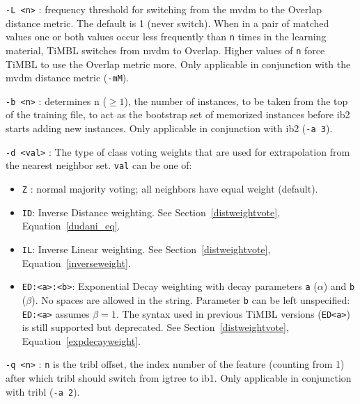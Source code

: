 \documentclass{report}
\begin{document}
\begin{description}
\item {\tt -L <n>} : frequency threshold for switching from the {\sc
mvdm} to the Overlap distance metric. The default is 1 (never
switch). When in a pair of matched values one or both values occur
less frequently than {\tt n} times in the learning material, TiMBL
switches from {\sc mvdm} to Overlap. Higher values of {\tt n} force
TiMBL to use the Overlap metric more. Only applicable in conjunction
with the {\sc mvdm} distance metric ({\tt -mM}).

\item {\tt -b <n>} : determines n ($\geq 1$), the number of instances,
to be taken from the top of the training file, to act as the bootstrap
set of memorized instances before {\sc ib2} starts adding new
instances. Only applicable in conjunction with {\sc ib2} ({\tt -a 3}).

\item {\tt -d <val>} : The type of class voting weights that are used for
extrapolation from the nearest neighbor set. {\tt val} can be one of:
	\begin{itemize} 

  	\item {\tt Z} : normal majority voting; all neighbors have
         equal weight (default).

  	\item {\tt ID}: Inverse Distance weighting. See
  	Section~\ref{distweightvote}, Equation~\ref{dudani_eq}.

  	\item {\tt IL}: Inverse Linear weighting. See
  	Section~\ref{distweightvote}, Equation~\ref{inverseweight}.

  	\item {\tt ED:<a>:<b>}: Exponential Decay weighting with decay
  	parameters {\tt a} ($\alpha$) and {\tt b} ($\beta$). No spaces
  	are allowed in the string. Parameter {\tt b} can be left
  	unspecified: {\tt ED:<a>} assumes $\beta=1$. The syntax used
  	in previous TiMBL versions ({\tt ED<a>}) is still supported
  	but deprecated. See Section~\ref{distweightvote},
  	Equation~\ref{expdecayweight}.

\end{itemize}

\item {\tt -q <n>} : {\tt n} is the {\sc tribl} offset, the index
number of the feature (counting from 1) after which {\sc tribl} should
switch from {\sc igtree} to {\sc ib1}. Only applicable in conjunction
with {\sc tribl} ({\tt -a 2}).


\end{description}
\end{document}
